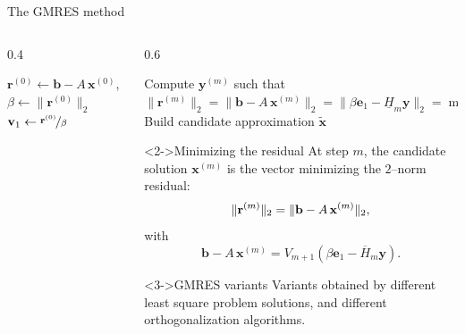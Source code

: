 \documentclass[aspectratio=169,xcolor=dvipsnames]{beamer}
\begin{document}
\begin{frame}{The GMRES method \parencite{GMRES}}
\begin{columns}
\begin{column}{0.4\columnwidth}
	\begin{algorithm}[H]\small
		$\mathbf{r}^{(0)} \leftarrow \mathbf{b}-A\,\mathbf{x}^{(0)}$, 
		$\beta\leftarrow\|\mathbf{r}^{(0)}\|_2$\; $\mathbf{v}_1\leftarrow
		\nicefrac{\mathbf{r}^{(0)}}{\beta}$\; 
	\end{algorithm}
\end{column}
\begin{column}{0.6\columnwidth}
\begin{algorithm}[H]
Compute $\mathbf{y}^{(m)}$  such that
$\|\mathbf{r}^{(m)}\|_2=\|\mathbf{b}-A\,\mathbf{x}^{(m)}\|_2= \|\beta \mathbf{e}_1-\underline{H}_m
\mathbf{y}\|_2=\min_{\mathbf{y}\in\mathbb{R}^m}$\;
Build candidate approximation $\tilde{\textbf{x}}$\;
\end{algorithm}
\vspace{-0.5em}
\begin{block}<2->{Minimizing the residual}
At step $m$, the candidate solution $\mathbf{x}^{(m)}$ is the vector
minimizing the $2$--norm residual:\vspace{-0.5em}
\begin{equation*}
	\|\mathbf{r}^{(m)}\|_2=\|\mathbf{b}-A\,\mathbf{x}^{(m)}\|_2,\vspace{-0.5em}
\end{equation*}
with\vspace{-0.5em}
\[
\mathbf{b}-A\,\mathbf{x}^{(m)}  = V_{m+1} (\beta \textbf{e}_1 - \overline{H}_m \textbf{y}).
\]
\end{block}
\vspace{-0.5em}
\begin{block}<3->{GMRES variants}
\alert{Variants} obtained by different \alert{least square} problem \alert{solutions}, and \alert{different orthogonalization} algorithms.
\end{block}

\end{column}
\end{columns}
\end{frame}
\end{document}
